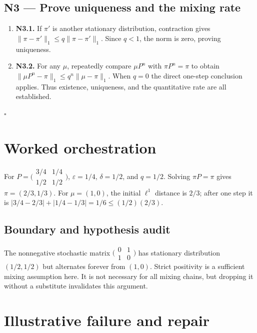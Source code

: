 \documentclass[preprint,12pt,aps,pra,showkeys,amsmath,amssymb,superscriptaddress,floatfix]{revtex4-2}
\theoremstyle{definition}
\theoremstyle{remark}
\begin{document}
\subsection{N3 --- Prove uniqueness and the mixing
rate}\label{n3-prove-uniqueness-and-the-mixing-rate}

\begin{enumerate}
\def\labelenumi{\arabic{enumi}.}
\item
  \textbf{N3.1.} If \(\pi'\) is another stationary distribution,
  contraction gives \(\|\pi-\pi'\|_1\le q\|\pi-\pi'\|_1\). Since
  \(q<1\), the norm is zero, proving uniqueness.
\item
  \textbf{N3.2.} For any \(\mu\), repeatedly compare \(\mu P^n\) with
  \(\pi P^n=\pi\) to obtain \(\|\mu P^n-\pi\|_1\le q^n\|\mu-\pi\|_1\).
  When \(q=0\) the direct one-step conclusion applies. Thus existence,
  uniqueness, and the quantitative rate are all established.
\end{enumerate}

\hfill$\square$

\section{Worked orchestration}

For
\(P=\bigl(\begin{smallmatrix}3/4&1/4\\1/2&1/2\end{smallmatrix}\bigr)\),
\(\varepsilon=1/4\), \(\delta=1/2\), and \(q=1/2\). Solving
\(\pi P=\pi\) gives \(\pi=(2/3,1/3)\). For \(\mu=(1,0)\), the initial
\(\ell^1\) distance is \(2/3\); after one step it is
\(|3/4-2/3|+|1/4-1/3|=1/6\le(1/2)(2/3)\).

\subsection{Boundary and hypothesis audit}

The nonnegative stochastic matrix
\(\bigl(\begin{smallmatrix}0&1\\1&0\end{smallmatrix}\bigr)\) has
stationary distribution \((1/2,1/2)\) but alternates forever from
\((1,0)\). Strict positivity is a sufficient mixing assumption here. It
is not necessary for all mixing chains, but dropping it without a
substitute invalidates this argument.

\section{Illustrative failure and repair}
\end{document}
